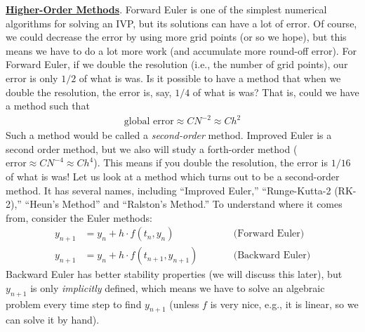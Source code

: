 \documentclass[10pt,reqno]{amsart}
\theoremstyle{plain}
\theoremstyle{definition}
\theoremstyle{remark}
\numberwithin{figure}{section}   %
\begin{document}
\noindent\textbf{\underline{Higher-Order Methods}}. Forward Euler is one of the simplest numerical algorithms for solving an IVP, but its solutions can have a lot of error.  Of course, we could decrease the error by using more grid points (or so we hope), but this means we have to do a lot more work (and accumulate more round-off error).  For Forward Euler, if we double the resolution (i.e., the number of grid points), our error is only $1/2$ of what is was.  Is it possible to have a method that when we double the resolution, the error is, say, $1/4$ of what is was?  That is, could we have a method such that
\begin{align*}
 \text{global error} \approx CN^{-2} \approx Ch^2
\end{align*}
Such a method would be called a \textit{second-order} method.  Improved Euler is a second order method, but we also will study a forth-order method ($\text{error} \approx CN^{-4} \approx Ch^4$).  This means if you double the resolution, the error is $1/16$ of what is was!
Let us look at a method which turns out to be a second-order method.  It has several names, including ``Improved Euler,'' ``Runge-Kutta-2 (RK-2),'' ``Heun's Method'' and ``Ralston's Method.''  To understand where it comes from, consider the Euler methods:
\begin{align*}
  y_{n+1} &= y_n + h\cdot f(t_n,y_n) \qquad&&\text{(Forward Euler)}
   \\
   y_{n+1} &= y_n + h\cdot f(t_{n+1},y_{n+1}) \qquad&&\text{(Backward Euler)}
 \end{align*}
 Backward Euler has better stability properties (we will discuss this later), but $y_{n+1}$ is only \textit{implicitly} defined, which means we have to solve an algebraic problem every time step to find $y_{n+1}$ (unless $f$ is very nice, e.g., it is linear, so we can solve it by hand).  
 
 \pagebreak
 
\end{document}
